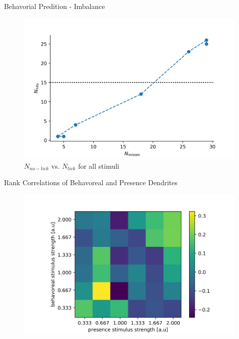 \documentclass[10pt]{beamer}
\begin{document}
\begin{frame}[fragile]{Behavorial Predition - Imbalance}
\begin{center}
	\begin{figure}
	  \caption*{$N_{no-lick}$ vs. $N_{lick}$ for all stimuli}
      \includegraphics[width=1.0\textwidth]{fraction.png}
	\end{figure}
	\end{center}
\end{frame}


\begin{frame}[fragile]{Rank Correlations of Behavoreal and Presence Dendrites}
\begin{center}
	\begin{figure}
      \includegraphics[width=1.0\textwidth]{transrank.png}
	\end{figure}
	\end{center}
\end{frame}
\end{document}
